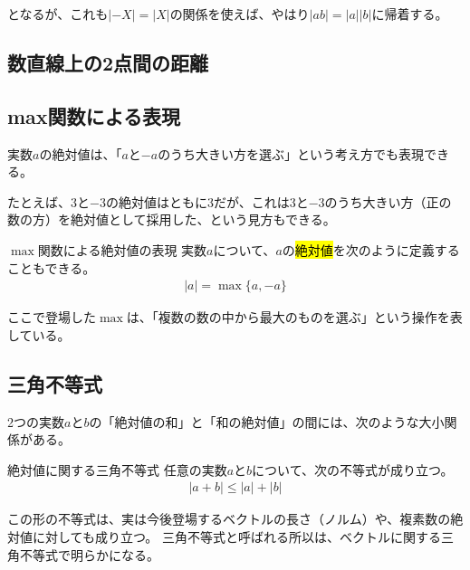 \documentclass[../../imaging-math]{subfiles}
\begin{document}
となるが、これも$|-X| = |X|$の関係を使えば、やはり$|ab| = |a||b|$に帰着する。

\subsection{数直線上の2点間の距離}

\wip

\subsection{max関数による表現}

実数$a$の絶対値は、「$a$と$-a$のうち大きい方を選ぶ」という考え方でも表現できる。

たとえば、$3$と$-3$の絶対値はともに$3$だが、これは$3$と$-3$のうち大きい方（正の数の方）を絶対値として採用した、という見方もできる。

\begin{definition}{$\max$関数による絶対値の表現}
  \newline
  実数$a$について、$a$の\hl{絶対値}を次のように定義することもできる。
  \LARGE
  \begin{align}
    |a| = \max\{a, -a\}
  \end{align}
\end{definition}

ここで登場した$\max$は、「複数の数の中から最大のものを選ぶ」という操作を表している。

\subsection{三角不等式}

2つの実数$a$と$b$の「絶対値の和」と「和の絶対値」の間には、次のような大小関係がある。

\begin{theorem}{絶対値に関する三角不等式}
  \newline
  任意の実数$a$と$b$について、次の不等式が成り立つ。
  \LARGE
  \begin{align}
    |a + b| \leq |a| + |b|
  \end{align}
\end{theorem}

\begin{supplnote}
  この形の不等式は、実は今後登場するベクトルの長さ（ノルム）や、複素数の絶対値に対しても成り立つ。
  三角不等式と呼ばれる所以は、ベクトルに関する三角不等式で明らかになる。
\end{supplnote}
\end{document}
